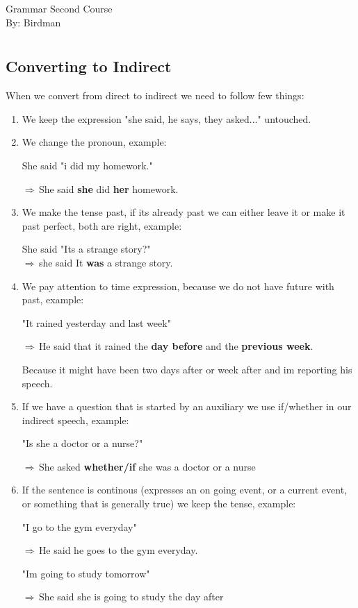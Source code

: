 \documentclass[12pt, a4paper]{article}
\newcommand{\exarrow}{{\Large{$\Rightarrow$}\,}}
\begin{document}
\begin{center}
\LARGE{Grammar Second Course}\\[0.5cm]
\Large{By: Birdman}\\[1cm]
\end{center}

\section*{}

\subsection*{Converting to Indirect}
{\fontpar
When we convert from direct to indirect we need to follow 
few things:

\begin{enumerate}
\item We keep the expression "she said, he says, they asked..." untouched.
\item We change the pronoun, example:

  She said "i did my homework." 

 \exarrow She said \textbf{she} did \textbf{her} homework.

\item We make the tense past, if its already past we can either
  leave it or make it past perfect, both are right, example:

  She said "Its a strange story?"\\
\exarrow  she said It \textbf{was} a strange story.
\item We pay attention to time expression, because we do not have 
  future with past, example:

  "It rained yesterday and last week"

\exarrow He said that it rained the \textbf{day before} and the 
  \textbf{previous week}.

Because it might have been two days after or week after and 
im reporting his speech.

\item If we have a question that is started by an auxiliary we
  use if/whether in our indirect speech, example:

 "Is she a doctor or a nurse?"

\exarrow She asked \textbf{whether/if} she was a doctor 
  or a nurse

\item If the sentence is continous (expresses an on going event,
  or a current event, or something that is generally true) we keep the
  tense, example:

  "I go to the gym everyday"

  \exarrow He said he goes to the gym everyday.

  "Im going to study tomorrow"

  \exarrow She said she is going to study the day after
\end{enumerate}
}

 
\end{document}
